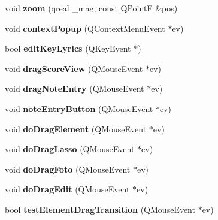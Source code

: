 \begin{DoxyCompactItemize}
void {\bfseries zoom} (qreal \+\_\+mag, const Q\+PointF \&pos)
\item 
\mbox{\label{class_ms_1_1_score_view_aa2400f233d6d198de07901bc295bb722}} 
void {\bfseries context\+Popup} (Q\+Context\+Menu\+Event $\ast$ev)
\item 
\mbox{\label{class_ms_1_1_score_view_ada4f1ec931d76ab1cfd36d6d858c2347}} 
bool {\bfseries edit\+Key\+Lyrics} (Q\+Key\+Event $\ast$)
\item 
\mbox{\label{class_ms_1_1_score_view_a4892156600af3c4f984c9834b8bab17d}} 
void {\bfseries drag\+Score\+View} (Q\+Mouse\+Event $\ast$ev)
\item 
\mbox{\label{class_ms_1_1_score_view_a2bfad1071b59541352a9d05d59e4f5ce}} 
void {\bfseries drag\+Note\+Entry} (Q\+Mouse\+Event $\ast$ev)
\item 
\mbox{\label{class_ms_1_1_score_view_ab5c135080457988d1ff20dcf94dea8f8}} 
void {\bfseries note\+Entry\+Button} (Q\+Mouse\+Event $\ast$ev)
\item 
\mbox{\label{class_ms_1_1_score_view_a8d096f0f6b81d19279d2fa394ffd9695}} 
void {\bfseries do\+Drag\+Element} (Q\+Mouse\+Event $\ast$ev)
\item 
\mbox{\label{class_ms_1_1_score_view_a3dc36593be9301e1e5461fecfdbee728}} 
void {\bfseries do\+Drag\+Lasso} (Q\+Mouse\+Event $\ast$ev)
\item 
\mbox{\label{class_ms_1_1_score_view_ab721f6e79a0f2c618b54cb7cb5c493e0}} 
void {\bfseries do\+Drag\+Foto} (Q\+Mouse\+Event $\ast$ev)
\item 
\mbox{\label{class_ms_1_1_score_view_a8072cd9d2a842803cb839c189307182b}} 
void {\bfseries do\+Drag\+Edit} (Q\+Mouse\+Event $\ast$ev)
\item 
\mbox{\label{class_ms_1_1_score_view_afdb4f98796dbce13a01e57e1d492ed01}} 
bool {\bfseries test\+Element\+Drag\+Transition} (Q\+Mouse\+Event $\ast$ev)

\end{DoxyCompactItemize}
